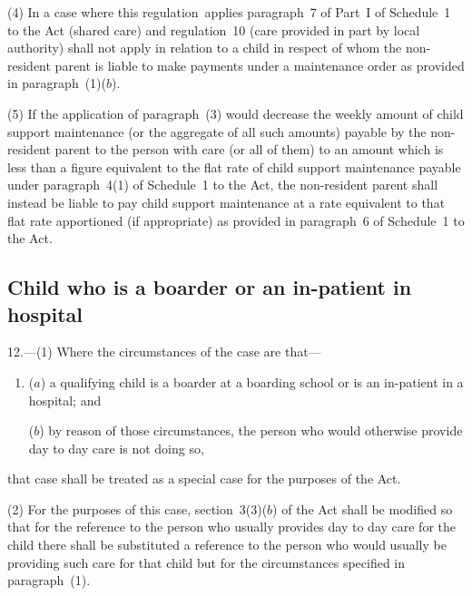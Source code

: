 \documentclass[12pt,a4paper]{article}
\begin{document}
(4) In a case where this regulation~applies paragraph~7 of Part~I of Schedule~1 to the Act (shared care) and regulation~10 (care provided in part by local authority) shall not apply in relation to a child in respect of whom the non-resident parent is liable to make payments under a maintenance order as provided in paragraph~(1)($b$).

\begin{sloppypar}
(5) If the application of paragraph~(3) would decrease the weekly amount of child support maintenance (or the aggregate of all such amounts) payable by the non-resident parent to the person with care (or all of them) to an amount which is less than a figure equivalent to the flat rate of child support maintenance payable under paragraph~4(1) of Schedule~1 to the Act, the non-resident parent shall instead be liable to pay child support maintenance at a rate equivalent to that flat rate apportioned (if appropriate) as provided in paragraph~6 of Schedule~1 to the Act.
\end{sloppypar}


\subsection[12. Child who is a boarder or an in-patient in hospital]{Child who is a boarder or an in-patient in hospital}

12.---(1)  Where the circumstances of the case are that—
\begin{enumerate}\item[]
($a$) a qualifying child is a boarder at a boarding school or is an in-patient in a hospital; and

($b$) by reason of those circumstances, the person who would otherwise provide day to day care is not doing so,
\end{enumerate}
that case shall be treated as a special case for the purposes of the Act.

(2) For the purposes of this case, section~3(3)($b$)  of the Act shall be modified so that for the reference to the person who usually provides day to day care for the child there shall be substituted a reference to the person who would usually be providing such care for that child but for the circumstances specified in paragraph~(1).
\end{document}
